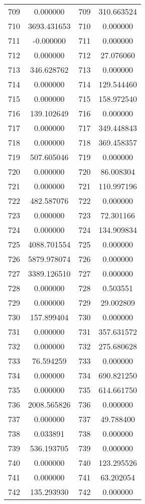 \documentclass[12pt]{article}
\begin{document}
\begin{longtable}{@{}cccc@{}}
709 & 0.000000 & 709 & 310.663524 \\
710 & 3693.431653 & 710 & 0.000000 \\
711 & -0.000000 & 711 & 0.000000 \\
712 & 0.000000 & 712 & 27.076060 \\
713 & 346.628762 & 713 & 0.000000 \\
714 & 0.000000 & 714 & 129.544460 \\
715 & 0.000000 & 715 & 158.972540 \\
716 & 139.102649 & 716 & 0.000000 \\
717 & 0.000000 & 717 & 349.448843 \\
718 & 0.000000 & 718 & 369.458357 \\
719 & 507.605046 & 719 & 0.000000 \\
720 & 0.000000 & 720 & 86.008304 \\
721 & 0.000000 & 721 & 110.997196 \\
722 & 482.587076 & 722 & 0.000000 \\
723 & 0.000000 & 723 & 72.301166 \\
724 & 0.000000 & 724 & 134.909834 \\
725 & 4088.701554 & 725 & 0.000000 \\
726 & 5879.978074 & 726 & 0.000000 \\
727 & 3389.126510 & 727 & 0.000000 \\
728 & 0.000000 & 728 & 0.503551 \\
729 & 0.000000 & 729 & 29.002809 \\
730 & 157.899404 & 730 & 0.000000 \\
731 & 0.000000 & 731 & 357.631572 \\
732 & 0.000000 & 732 & 275.680628 \\
733 & 76.594259 & 733 & 0.000000 \\
734 & 0.000000 & 734 & 690.821250 \\
735 & 0.000000 & 735 & 614.661750 \\
736 & 2008.565826 & 736 & 0.000000 \\
737 & 0.000000 & 737 & 49.788400 \\
738 & 0.033891 & 738 & 0.000000 \\
739 & 536.193705 & 739 & 0.000000 \\
740 & 0.000000 & 740 & 123.295526 \\
741 & 0.000000 & 741 & 63.202054 \\
742 & 135.293930 & 742 & 0.000000 \\

\end{longtable}
\end{document}
